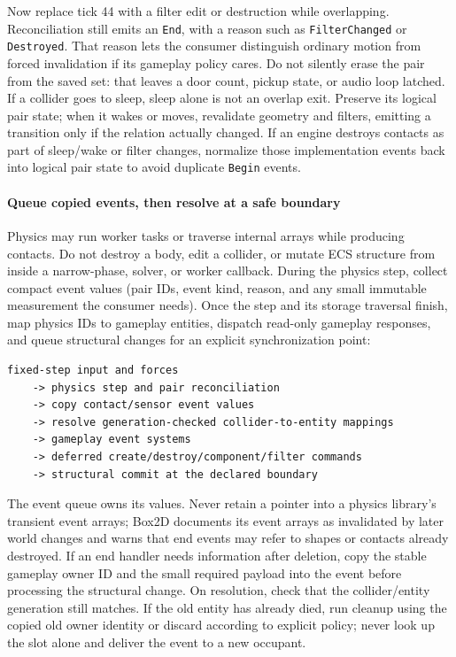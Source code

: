 Now replace tick 44 with a filter edit or destruction while overlapping. Reconciliation still emits an \texttt{End}, with a reason such as \texttt{FilterChanged} or \texttt{Destroyed}. That reason lets the consumer distinguish ordinary motion from forced invalidation if its gameplay policy cares. Do not silently erase the pair from the saved set: that leaves a door count, pickup state, or audio loop latched. If a collider goes to sleep, sleep alone is not an overlap exit. Preserve its logical pair state; when it wakes or moves, revalidate geometry and filters, emitting a transition only if the relation actually changed. If an engine destroys contacts as part of sleep/wake or filter changes, normalize those implementation events back into logical pair state to avoid duplicate \texttt{Begin} events.

\paragraph{Queue copied events, then resolve at a safe boundary}\label{queue-copied-events-then-resolve-at-a-safe-boundary}

Physics may run worker tasks or traverse internal arrays while producing contacts. Do not destroy a body, edit a collider, or mutate ECS structure from inside a narrow-phase, solver, or worker callback. During the physics step, collect compact event values (pair IDs, event kind, reason, and any small immutable measurement the consumer needs). Once the step and its storage traversal finish, map physics IDs to gameplay entities, dispatch read-only gameplay responses, and queue structural changes for an explicit synchronization point:

\begin{verbatim}
fixed-step input and forces
    -> physics step and pair reconciliation
    -> copy contact/sensor event values
    -> resolve generation-checked collider-to-entity mappings
    -> gameplay event systems
    -> deferred create/destroy/component/filter commands
    -> structural commit at the declared boundary
\end{verbatim}

The event queue owns its values. Never retain a pointer into a physics library's transient event arrays; Box2D documents its event arrays as invalidated by later world changes and warns that end events may refer to shapes or contacts already destroyed. If an end handler needs information after deletion, copy the stable gameplay owner ID and the small required payload into the event before processing the structural change. On resolution, check that the collider/entity generation still matches. If the old entity has already died, run cleanup using the copied old owner identity or discard according to explicit policy; never look up the slot alone and deliver the event to a new occupant.

